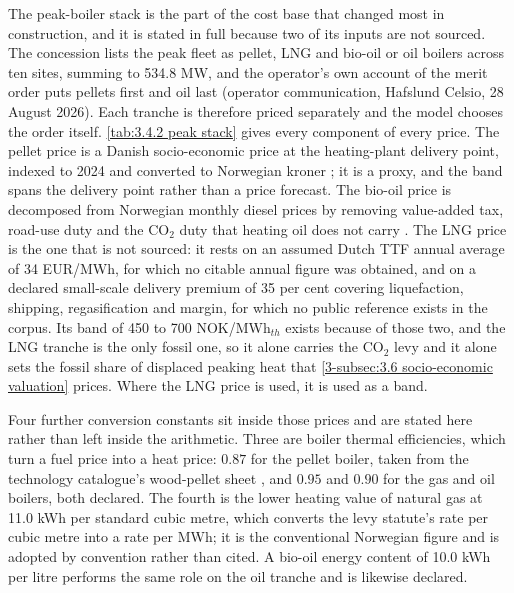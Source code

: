 The peak-boiler stack is the part of the cost base that changed most in construction, and it is stated in full because two of its inputs are not sourced. The concession lists the peak fleet as pellet, LNG and bio-oil or oil boilers across ten sites, summing to 534.8 MW, and the operator's own account of the merit order puts pellets first and oil last (operator communication, Hafslund Celsio, 28 August 2026). Each tranche is therefore priced separately and the model chooses the order itself. \autoref{tab:3.4.2 peak stack} gives every component of every price. The pellet price is a Danish socio-economic price at the heating-plant delivery point, indexed to 2024 and converted to Norwegian kroner \cite{energistyrelsen_dk_samfundsokonomiske_2024}; it is a proxy, and the band spans the delivery point rather than a price forecast. The bio-oil price is decomposed from Norwegian monthly diesel prices by removing value-added tax, road-use duty and the CO$_2$ duty that heating oil does not carry \cite{statistisk_sentralbyra_statbank_nodate}. The LNG price is the one that is not sourced: it rests on an assumed Dutch TTF annual average of 34 EUR/MWh, for which no citable annual figure was obtained, and on a declared small-scale delivery premium of 35 per cent covering liquefaction, shipping, regasification and margin, for which no public reference exists in the corpus. Its band of 450 to 700 NOK/MWh$_{th}$ exists because of those two, and the LNG tranche is the only fossil one, so it alone carries the CO$_2$ levy and it alone sets the fossil share of displaced peaking heat that \autoref{3-subsec:3.6 socio-economic valuation} prices. Where the LNG price is used, it is used as a band.

Four further conversion constants sit inside those prices and are stated here rather than left inside the arithmetic. Three are boiler thermal efficiencies, which turn a fuel price into a heat price: $0.87$ for the pellet boiler, taken from the technology catalogue's wood-pellet sheet \cite{danish_energy_agency_energy_2025}, and $0.95$ and $0.90$ for the gas and oil boilers, both declared. The fourth is the lower heating value of natural gas at 11.0 kWh per standard cubic metre, which converts the levy statute's rate per cubic metre into a rate per MWh; it is the conventional Norwegian figure and is adopted by convention rather than cited. A bio-oil energy content of 10.0 kWh per litre performs the same role on the oil tranche and is likewise declared.

